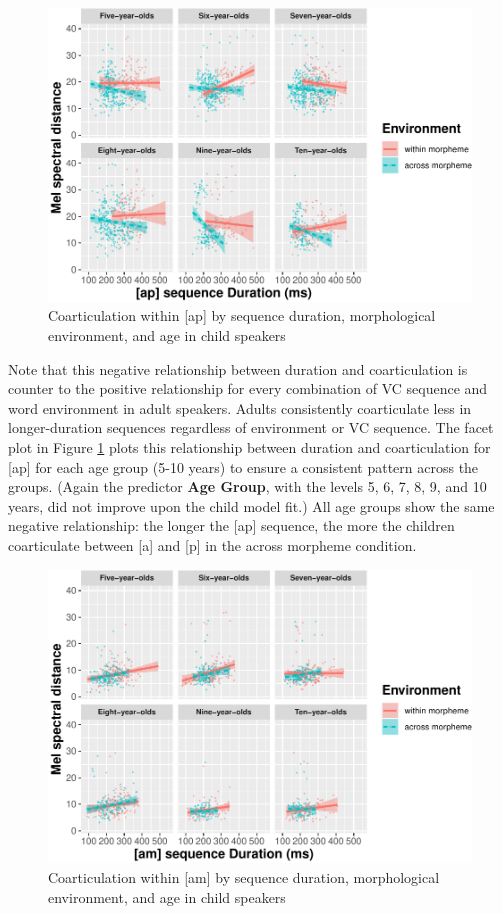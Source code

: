 \documentclass[a4paper,man,floatsintext,natbib,donotrepeattitle, apacite]{apa6}
\begin{document}
\begin{figure}
\centering
\includegraphics{3_ch3_results_files/figure-latex/child-facet-ap-1.pdf}
\caption{\label{fig:child-facet-ap}Coarticulation within {[}ap{]} by sequence duration, morphological environment, and age in child speakers}
\end{figure}

Note that this negative relationship between duration and coarticulation is counter to the positive relationship for every combination of VC sequence and word environment in adult speakers. Adults consistently coarticulate less in longer-duration sequences regardless of environment or VC sequence. The facet plot in Figure \ref{fig:child-facet-ap} plots this relationship between duration and coarticulation for {[}ap{]} for each age group (5-10 years) to ensure a consistent pattern across the groups. (Again the predictor \textbf{Age Group}, with the levels 5, 6, 7, 8, 9, and 10 years, did not improve upon the child model fit.) All age groups show the same negative relationship: the longer the {[}ap{]} sequence, the more the children coarticulate between {[}a{]} and {[}p{]} in the across morpheme condition.

\begin{figure}
\centering
\includegraphics{3_ch3_results_files/figure-latex/child-facet-am-1.pdf}
\caption{\label{fig:child-facet-am}Coarticulation within {[}am{]} by sequence duration, morphological environment, and age in child speakers}
\end{figure}
\end{document}
